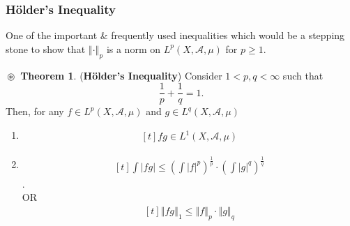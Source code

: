 \documentclass{article}
\theoremstyle{definition}
\newtheorem{theorem}{$\boxed{\boxed{\circledast}}$ Theorem}
\theoremstyle{remark}
\theoremstyle{definition}
\theoremstyle{definition}
\theoremstyle{definition}
\newcommand{\abs}[1]{\left \vert #1\right \vert}
\newcommand{\norm}[1]{\left \Vert #1 \right \Vert}
\newcommand{\alg}[1]{\mathscr{#1}}
\newcommand{\Lp}[1]{L^{p}\left (#1\right )}
\newcommand{\wnorm}[2]{\left (\int \abs{#2}^{#1}\right )^{\frac{1}{#1}}}
\newcommand{\LS}[2]{L^{#1}\left (#2\right )}
\begin{document}
\subsubsection{H\"older's Inequality}
One of the important \& frequently used inequalities which would be a stepping stone to show that $ \norm{\cdot}_p $ is a norm on $ \Lp{X,\alg{A},\mu} $ for $ p\ge 1 $.
\begin{theorem}\label{T-8}
	(\textbf{H\"older's Inequality}) Consider $ 1<p,q<\infty $ such that 
	\[\frac{1}{p} + \frac{1}{q} = 1.\]
	Then, for any $ f \in \LS{p}{X,\alg{A},\mu}$ and $ g\in \LS{q}{X,\alg{A},\mu} $
	\begin{enumerate}
		\item { \[\begin{aligned}[t]
				fg \in \LS{1}{X,\alg{A},\mu}
			\end{aligned}\]}
		\item {\[\begin{aligned}[t]
				\int \abs{fg}\le \wnorm{p}{f} \cdot \wnorm{q}{g}
			\end{aligned}\].\\
		OR\\
\[\begin{aligned}[t]
	\norm{fg}_1\le \norm{f}_p\cdot \norm{g}_q 
\end{aligned}\]
}
	\end{enumerate}
\end{theorem}
\end{document}
